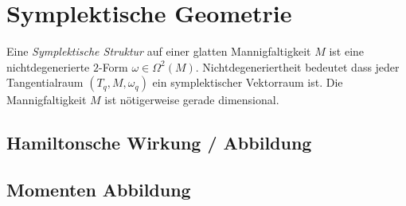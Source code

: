 \chapter{Symplektische Geometrie}
\begin{comment}
Siehe
\begin{itemize}
\item Eilenberg.pdf
\end{itemize}
TODO:
\begin{itemize}
\item symplektische Struktur
\item hamiltonsche Wirkung / Abbildung \cite[p161ff]{mcduff1998introduction}
\item momenten Abbildung \cite[p164ff]{mcduff1998introduction}
\item symplektische quotienten
\begin{itemize}
  \item \cite[Section 5.4]{mcduff1998introduction}
  \item Part IX aus 
    \textbf{[Ana Cannas da Silva] Lectures on Symplectic Geometry}
  \item \cite[chapter 1]{citeulike:4402830}
\end{itemize}
\end{itemize}
\textbf{Es muss Lie (teilweise) vor Symplektische Geometrie!}
\end{comment}

Eine \emph{Symplektische Struktur} auf einer glatten Mannigfaltigkeit $M$ ist
eine nichtdegenerierte $2$-Form $\omega\in\Omega^2(M)$.
Nichtdegeneriertheit bedeutet dass jeder Tangentialraum $(T_q,M,\omega_q)$ ein
symplektischer Vektorraum ist.
Die Mannigfaltigkeit $M$ ist nötigerweise gerade dimensional.
\begin{comment}
Nach \cite[Corollary 2.5]{mcduff1998introduction} gilt, dass das $n$-fache
Wedge Produkt $\omega \wedge\dots\wedge\omega$ nicht verschwindet. Damit ist
$M$ orientierbar.
\end{comment}
\section{Hamiltonsche Wirkung / Abbildung}
\section{Momenten Abbildung}
\begin{comment}
The concept of a moment map is a generalization of that of a hamiltonian
function. The notion of a moment map associated to a group action on a
symplectic manifold formalizes the Noether principle, which states that to
every symmetry (such as a group action) in a mechanical system, there
corresponds a conserved quantity.
\\
Aus p127 
\textbf{[Ana Cannas da Silva] Lectures on Symplectic Geometry}
\end{comment}

%
